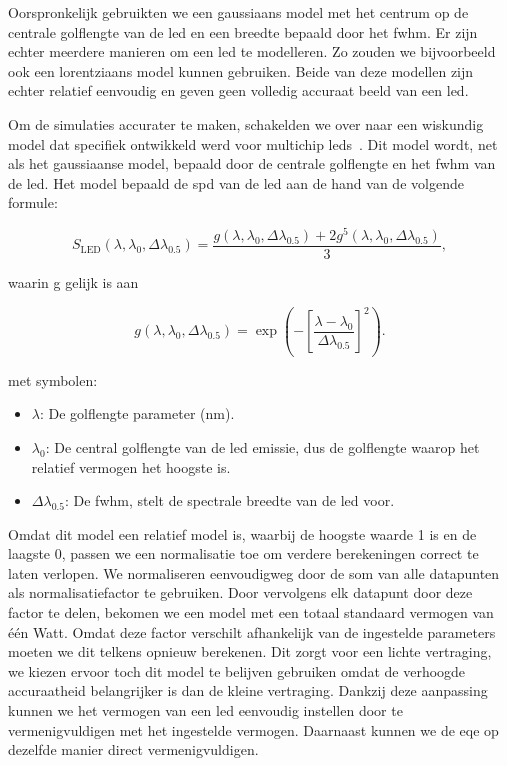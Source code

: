 Oorspronkelijk gebruikten we een gaussiaans model met het centrum op de centrale golflengte van de \gls{led} en een breedte bepaald door het \gls{fwhm}. Er zijn echter meerdere manieren om een \gls{led} te modelleren. Zo zouden we bijvoorbeeld ook een lorentziaans model kunnen gebruiken. Beide van deze modellen zijn echter relatief eenvoudig en geven geen volledig accuraat beeld van een \gls{led}. 

Om de simulaties accurater te maken, schakelden we over naar een wiskundig model dat specifiek ontwikkeld werd voor multichip \gls{led}s~\cite{ohnoSpectralDesignConsiderations2005}. Dit model wordt, net als het gaussiaanse model, bepaald door de centrale golflengte en het \gls{fwhm} van de \gls{led}. Het model bepaald de \gls{spd} van de \gls{led} aan de hand van de volgende formule:

\begin{equation}
    S_{\text{LED}}(\lambda, \lambda_0, \Delta \lambda_{0.5}) = \frac{\displaystyle g(\lambda, \lambda_0, \Delta \lambda_{0.5}) + 2g^5(\lambda, \lambda_0, \Delta \lambda_{0.5})}{3},
\end{equation}

waarin g gelijk is aan

\begin{equation}
    g(\lambda, \lambda_0, \Delta \lambda_{0.5}) = \exp\left(-\left[\frac{\lambda - \lambda_0}{\Delta \lambda_{0.5}}\right]^2\right).
\end{equation}

met symbolen:
\begin{itemize}
    \item \(\lambda\): De golflengte parameter (nm).
    \item \(\lambda_0\): De central golflengte van de \gls{led} emissie, dus de golflengte waarop het relatief vermogen het hoogste is.
    \item \(\Delta \lambda_{0.5}\): De \gls{fwhm}, stelt de spectrale breedte van de \gls{led} voor.
\end{itemize}

Omdat dit model een relatief model is, waarbij de hoogste waarde 1 is en de laagste 0, passen we een normalisatie toe om verdere berekeningen correct te laten verlopen. We normaliseren eenvoudigweg door de som van alle datapunten als normalisatiefactor te gebruiken. Door vervolgens elk datapunt door deze factor te delen, bekomen we een model met een totaal standaard vermogen van \'e\'en Watt. Omdat deze factor verschilt afhankelijk van de ingestelde parameters moeten we dit telkens opnieuw berekenen. Dit zorgt voor een lichte vertraging, we kiezen ervoor toch dit model te belijven gebruiken omdat de verhoogde accuraatheid belangrijker is dan de kleine vertraging. Dankzij deze aanpassing kunnen we het vermogen van een \gls{led} eenvoudig instellen door te vermenigvuldigen met het ingestelde vermogen. Daarnaast kunnen we de \gls{eqe} op dezelfde manier direct vermenigvuldigen.

